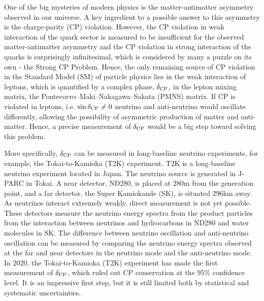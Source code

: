    One of the big mysteries of modern physics is the matter-antimatter asymmetry observed in our universe. A key ingredient to a possible answer to this asymmetry is the charge-parity (CP) violation. However, the CP violation in weak interaction of the quark sector is measured to be insufficient for the observed matter-antimatter asymmetry and the CP violation in strong interaction of the quarks is surprisingly infinitesimal, which is considered by many a puzzle on its own - the Strong CP Problem. Hence, the only remaining source of CP violation in the Standard Model (SM) of particle physics lies in the weak interaction of leptons, which is quantified by a complex phase, $\delta_\textrm{CP}$, in the lepton mixing matrix, the Pontecorvo–Maki–Nakagawa–Sakata (PMNS) matrix. If CP is violated in leptons, i.e. $\sin{\delta_\textrm{CP}}\neq0$ neutrino and anti-neutrino would oscillate differently, allowing the possibility of asymmetric production of matter and anti-matter. Hence, a precise measurement of $\delta_\textrm{CP}$ would be a big step toward solving this problem. 
   
   More specifically, $\delta_\textrm{CP}$ can be measured in long-baseline neutrino experiments, for example, the Tokai-to-Kamioka (T2K) experiment\cite{T2KEXP}. T2K is a long-baseline neutrino experiment located in Japan. The neutrino source is generated in J-PARC in Tokai. A near detector, ND280, is placed at $280\textrm{m}$ from the generation point, and a far detector, the Super Kamiokande (SK), is situated 296km away. As neutrinos interact extremely weakly, direct measurement is not yet possible. These detectors measure the neutrino energy spectra from the product particles from the interaction between neutrinos and hydrocarbons in ND280 and water molecules in SK. The difference between neutrino oscillation and anti-neutrino oscillation can be measured by comparing the neutrino energy spectra observed at the far and near detectors in the neutrino mode and the anti-neutrino mode. In 2020, the Tokai-to-Kamioka (T2K) experiment\cite{T2KEXP} has made the first measurement of $\delta_\textrm{CP}$\cite{T2Knature}, which ruled out CP conservation at the $95\%$ confidence level. It is an impressive first step, but it is still limited both by statistical and systematic uncertainties. 


